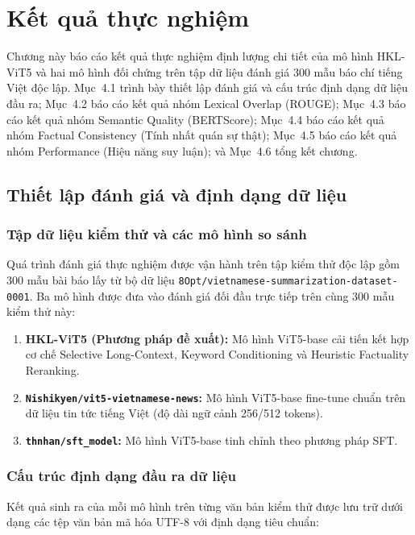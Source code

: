\chapter{Kết quả thực nghiệm}

Chương này báo cáo kết quả thực nghiệm định lượng chi tiết của mô hình HKL-ViT5 và hai mô hình đối chứng trên tập dữ liệu đánh giá 300 mẫu báo chí tiếng Việt độc lập.
Mục~4.1 trình bày thiết lập đánh giá và cấu trúc định dạng dữ liệu đầu ra;
Mục~4.2 báo cáo kết quả nhóm Lexical Overlap (ROUGE);
Mục~4.3 báo cáo kết quả nhóm Semantic Quality (BERTScore);
Mục~4.4 báo cáo kết quả nhóm Factual Consistency (Tính nhất quán sự thật);
Mục~4.5 báo cáo kết quả nhóm Performance (Hiệu năng suy luận); và Mục~4.6 tổng kết chương.

\section{Thiết lập đánh giá và định dạng dữ liệu}

\subsection{Tập dữ liệu kiểm thử và các mô hình so sánh}

Quá trình đánh giá thực nghiệm được vận hành trên tập kiểm thử độc lập gồm 300 mẫu bài báo lấy từ bộ dữ liệu \texttt{8Opt/vietnamese-summarization-dataset-0001}. Ba mô hình được đưa vào đánh giá đối đầu trực tiếp trên cùng 300 mẫu kiểm thử này:

\begin{enumerate}[label=\arabic*.]
  \item \textbf{HKL-ViT5 (Phương pháp đề xuất):} Mô hình ViT5-base cải tiến kết hợp cơ chế Selective Long-Context, Keyword Conditioning và Heuristic Factuality Reranking.
  \item \textbf{\texttt{Nishikyen/vit5-vietnamese-news}:} Mô hình ViT5-base fine-tune chuẩn trên dữ liệu tin tức tiếng Việt (độ dài ngữ cảnh 256/512 tokens).
  \item \textbf{\texttt{thnhan/sft\_model}:} Mô hình ViT5-base tinh chỉnh theo phương pháp SFT.
\end{enumerate}

\subsection{Cấu trúc định dạng đầu ra dữ liệu}

Kết quả sinh ra của mỗi mô hình trên từng văn bản kiểm thử được lưu trữ dưới dạng các tệp văn bản mã hóa UTF-8 với định dạng tiêu chuẩn:

